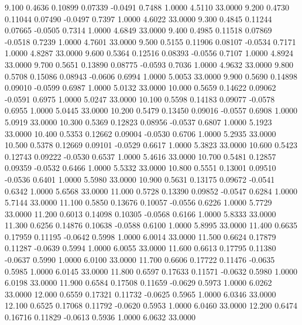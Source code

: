    9.100   0.4636   0.10899   0.07339  -0.0491   0.7488   1.0000   4.5110  33.0000
   9.200   0.4730   0.11044   0.07490  -0.0497   0.7397   1.0000   4.6022  33.0000
   9.300   0.4845   0.11244   0.07665  -0.0505   0.7314   1.0000   4.6849  33.0000
   9.400   0.4985   0.11518   0.07869  -0.0518   0.7239   1.0000   4.7601  33.0000
   9.500   0.5155   0.11906   0.08107  -0.0534   0.7171   1.0000   4.8287  33.0000
   9.600   0.5364   0.12516   0.08393  -0.0556   0.7107   1.0000   4.8924  33.0000
   9.700   0.5651   0.13890   0.08775  -0.0593   0.7036   1.0000   4.9632  33.0000
   9.800   0.5708   0.15086   0.08943  -0.0606   0.6994   1.0000   5.0053  33.0000
   9.900   0.5690   0.14898   0.09010  -0.0599   0.6987   1.0000   5.0132  33.0000
  10.000   0.5659   0.14622   0.09062  -0.0591   0.6975   1.0000   5.0247  33.0000
  10.100   0.5598   0.14183   0.09077  -0.0578   0.6955   1.0000   5.0445  33.0000
  10.200   0.5479   0.13450   0.09016  -0.0557   0.6908   1.0000   5.0919  33.0000
  10.300   0.5369   0.12823   0.08956  -0.0537   0.6807   1.0000   5.1923  33.0000
  10.400   0.5353   0.12662   0.09004  -0.0530   0.6706   1.0000   5.2935  33.0000
  10.500   0.5378   0.12669   0.09101  -0.0529   0.6617   1.0000   5.3823  33.0000
  10.600   0.5423   0.12743   0.09222  -0.0530   0.6537   1.0000   5.4616  33.0000
  10.700   0.5481   0.12857   0.09359  -0.0532   0.6466   1.0000   5.5332  33.0000
  10.800   0.5551   0.13001   0.09510  -0.0536   0.6401   1.0000   5.5980  33.0000
  10.900   0.5631   0.13175   0.09672  -0.0541   0.6342   1.0000   5.6568  33.0000
  11.000   0.5728   0.13390   0.09852  -0.0547   0.6284   1.0000   5.7144  33.0000
  11.100   0.5850   0.13676   0.10057  -0.0556   0.6226   1.0000   5.7729  33.0000
  11.200   0.6013   0.14098   0.10305  -0.0568   0.6166   1.0000   5.8333  33.0000
  11.300   0.6256   0.14876   0.10638  -0.0588   0.6100   1.0000   5.8995  33.0000
  11.400   0.6635   0.17959   0.11195  -0.0642   0.5998   1.0000   6.0014  33.0000
  11.500   0.6624   0.17879   0.11287  -0.0639   0.5994   1.0000   6.0055  33.0000
  11.600   0.6613   0.17795   0.11380  -0.0637   0.5990   1.0000   6.0100  33.0000
  11.700   0.6606   0.17722   0.11476  -0.0635   0.5985   1.0000   6.0145  33.0000
  11.800   0.6597   0.17633   0.11571  -0.0632   0.5980   1.0000   6.0198  33.0000
  11.900   0.6584   0.17508   0.11659  -0.0629   0.5973   1.0000   6.0262  33.0000
  12.000   0.6559   0.17321   0.11732  -0.0625   0.5965   1.0000   6.0346  33.0000
  12.100   0.6525   0.17068   0.11792  -0.0620   0.5953   1.0000   6.0460  33.0000
  12.200   0.6474   0.16716   0.11829  -0.0613   0.5936   1.0000   6.0632  33.0000
